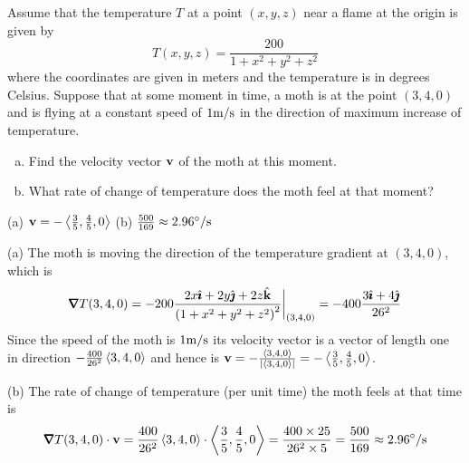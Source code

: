 \begin{question} [M200 2001A] %
Assume that the temperature $T$ at a point $(x,y,z)$ near
a flame at the origin is given by 
\begin{equation*}
T(x,y,z)=\frac{200}{1+x^2+y^2+z^2}
\end{equation*}
where the coordinates are given in meters and the temperature is in degrees
Celsius. Suppose that at some moment in time, a moth is at the point $(3,4,0)$
and is flying at a constant speed of $1 {\rm m/s}$ in the direction of maximum
increase of temperature.
\begin{enumerate}[(a)]
\item 
Find the velocity vector $\mathbf{v}$ of the moth at this moment.

\item
 What rate of change of temperature does the moth feel at that moment?
\end{enumerate}
\end{question}

%

\begin{answer}
(a) $\mathbf{v}=-\left< \frac{3}{5},\frac{4}{5},0\right>$\qquad
(b) $\frac{500}{169}\approx 2.96^\circ/{\rm s}$
\end{answer}

\begin{solution}
(a) The moth is moving the direction of the temperature gradient
at $(3,4,0)$, which is
\begin{equation*}
\vnabla T(3,4,0)
=-200\frac{2x\hi+2y\hj+2z\hk}{{(1+x^2+y^2+z^2)}^2}\bigg|_{(3,4,0)}
=-400\frac{3\hi+4\hj}{26^2}
\end{equation*}
Since the speed of the moth is $1 {\rm m/s}$ its velocity vector is a vector
of length one in direction $-\frac{400}{26^2}\left< 3,4,0\right>$ and hence is 
$\mathbf{v}=-\frac{\left< 3,4,0\right>}{|\left< 3,4,0\right>|}
=-\left<\frac{3}{5},\frac{4}{5},0\right>$.

(b) The rate of change of temperature (per unit time) the moth feels at 
that time is 
\begin{equation*}
\vnabla T(3,4,0)\cdot\vv
=\frac{400}{26^2}\llt 3,4,0\rgt\cdot \llt\frac{3}{5},\frac{4}{5},0\rgt
=\frac{400\times25}{26^2\times 5}
=\frac{500}{169}\approx 2.96^\circ/{\rm s}
\end{equation*}

\end{solution}

